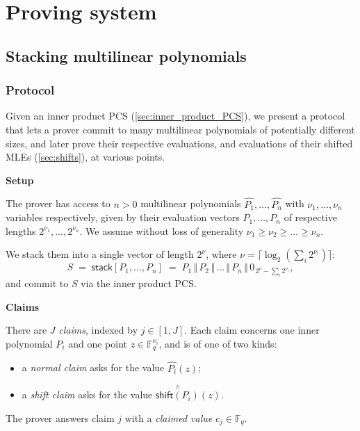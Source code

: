 \documentclass{article}
\theoremstyle{definition}
\newcommand{\Fq}{\mathbb F_q}
\begin{document}
\vspace{2mm}

\section{Proving system}\label{sec:proving}


\subsection{Stacking multilinear polynomials}\label{sec:stacking}

\subsubsection{Protocol}

Given an inner product PCS (\cref{sec:inner_product_PCS}), we present a protocol that lets a prover commit to many multilinear polynomials of potentially different sizes, and later prove their respective evaluations, and evaluations of their shifted MLEs (\cref{sec:shifts}), at various points.

\textbf{Setup}

The prover has access to $n > 0$ multilinear polynomials $\hat{P_1}, \dots, \hat{P_n}$ with $\nu_1, \dots, \nu_n$ variables respectively, given by their evaluation vectors $P_1, \dots, P_n$ of respective lengths $2^{\nu_1}, \dots, 2^{\nu_n}$. We assume without loss of generality $\nu_1 \geq \nu_2 \geq \dots \geq \nu_n$.

We stack them into a single vector of length $2^{\nu}$, where $\nu = \lceil \log_2(\sum_i 2^{\nu_i}) \rceil$:
\[
S \;=\; \textsf{stack}[P_1, \dots, P_n] \;=\; P_1 \,\Vert\, P_2 \,\Vert\, \dots \,\Vert\, P_n \,\Vert\, 0_{\,2^{\nu} - \sum_i 2^{\nu_i}},
\]
and commit to $S$ via the inner product PCS.

\textbf{Claims}

There are $J$ \textit{claims}, indexed by $j \in [1, J]$. Each claim concerns one inner polynomial $P_i$ and one point $z \in \Fq^{\nu_i}$, and is of one of two kinds:
\begin{itemize}
    \item a \textit{normal claim} asks for the value $\hat{P_i}(z)$;
    \item a \textit{shift claim} asks for the value $\overset{\scriptscriptstyle\wedge}{\textsf{shift}(P_i)}(z)$.
\end{itemize}
The prover answers claim $j$ with a \textit{claimed value} $c_j \in \Fq$.
\end{document}
